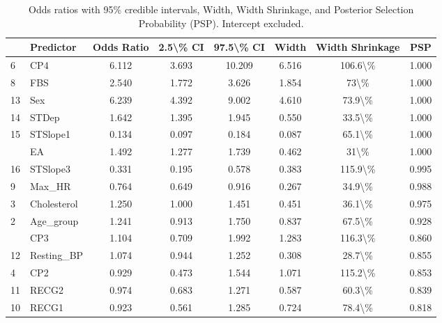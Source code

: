 \begin{table}

\caption{Odds ratios with 95\% credible intervals, Width, Width Shrinkage, and Posterior Selection Probability (PSP). Intercept excluded.}
\centering
\begin{tabular}[t]{llcccccc}
\toprule
  & Predictor & Odds Ratio & 2.5\textbackslash{}\% CI & 97.5\textbackslash{}\% CI & Width & Width Shrinkage & PSP\\
\midrule
6 & CP4 & 6.112 & 3.693 & 10.209 & 6.516 & 106.6\textbackslash{}\% & 1.000\\
8 & FBS & 2.540 & 1.772 & 3.626 & 1.854 & 73\textbackslash{}\% & 1.000\\
13 & Sex & 6.239 & 4.392 & 9.002 & 4.610 & 73.9\textbackslash{}\% & 1.000\\
14 & STDep & 1.642 & 1.395 & 1.945 & 0.550 & 33.5\textbackslash{}\% & 1.000\\
15 & STSlope1 & 0.134 & 0.097 & 0.184 & 0.087 & 65.1\textbackslash{}\% & 1.000\\
\addlinespace
7 & EA & 1.492 & 1.277 & 1.739 & 0.462 & 31\textbackslash{}\% & 1.000\\
16 & STSlope3 & 0.331 & 0.195 & 0.578 & 0.383 & 115.9\textbackslash{}\% & 0.995\\
9 & Max\_HR & 0.764 & 0.649 & 0.916 & 0.267 & 34.9\textbackslash{}\% & 0.988\\
3 & Cholesterol & 1.250 & 1.000 & 1.451 & 0.451 & 36.1\textbackslash{}\% & 0.975\\
2 & Age\_group & 1.241 & 0.913 & 1.750 & 0.837 & 67.5\textbackslash{}\% & 0.928\\
\addlinespace
5 & CP3 & 1.104 & 0.709 & 1.992 & 1.283 & 116.3\textbackslash{}\% & 0.860\\
12 & Resting\_BP & 1.074 & 0.944 & 1.252 & 0.308 & 28.7\textbackslash{}\% & 0.855\\
4 & CP2 & 0.929 & 0.473 & 1.544 & 1.071 & 115.2\textbackslash{}\% & 0.853\\
11 & RECG2 & 0.974 & 0.683 & 1.271 & 0.587 & 60.3\textbackslash{}\% & 0.839\\
10 & RECG1 & 0.923 & 0.561 & 1.285 & 0.724 & 78.4\textbackslash{}\% & 0.818\\
\bottomrule
\end{tabular}
\end{table}
